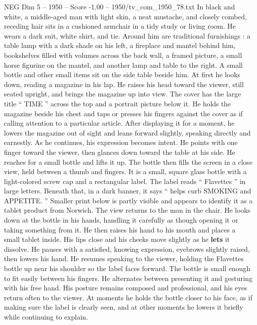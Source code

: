 \begin{textsample}{NEG Dim 5 – 1950 – Score -1.00 – 1950/tv\_com\_1950\_78.txt}  \label{ex:f5_neg_030}
In black and white, a middle-aged man with light skin, a neat mustache, and closely combed, receding hair sits in a cushioned armchair in a tidy study or living room.
He wears a dark suit, white shirt, and tie.
Around him are traditional furnishings : a table lamp with a dark shade on his left, a fireplace and mantel behind him, bookshelves filled with volumes across the back wall, a framed picture, a small horse figurine on the mantel, and another lamp and table to the right.
A small bottle and other small items sit on the side table beside him.
At first he looks down, reading a magazine in his lap.
He raises his head toward the viewer, still seated upright, and brings the magazine up into view.
The cover has the large title “ TIME ” across the top and a portrait picture below it.
He holds the magazine beside his chest and taps or presses his fingers against the cover as if calling attention to a particular article.
After displaying it for a moment, he lowers the magazine out of sight and leans forward slightly, speaking directly and earnestly.
As he continues, his expression becomes intent.
He points with one finger toward the viewer, then glances down toward the table at his side.
He reaches for a small bottle and lifts it up.
The bottle then fills the screen in a close view, held between a thumb and fingers.
It is a small, square glass bottle with a light-colored screw cap and a rectangular label.
The label reads “ Flavettes ” in large letters.
Beneath that, in a dark banner, it says “ helps curb SMOKING and APPETITE. ” Smaller print below is partly visible and appears to identify it as a tablet product from Norwich.
The view returns to the man in the chair.
He looks down at the bottle in his hands, handling it carefully as though opening it or taking something from it.
He then raises his hand to his mouth and places a small tablet inside.
His lips close and his cheeks move slightly as he \textbf{lets} it dissolve.
He pauses with a satisfied, knowing expression, eyebrows slightly raised, then lowers his hand.
He resumes speaking to the viewer, holding the Flavettes bottle up near his shoulder so the label faces forward.
The bottle is small enough to fit easily between his fingers.
He alternates between presenting it and gesturing with his free hand.
His posture remains composed and professional, and his eyes return often to the viewer.
At moments he holds the bottle closer to his face, as if making sure the label is clearly seen, and at other moments he lowers it briefly while continuing to explain.

\end{textsample}
